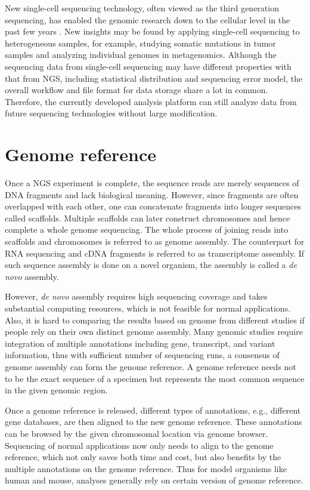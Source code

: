 New single-cell sequencing technology, often viewed as the third generation
sequencing, has enabled the genomic research down to the cellular level in the
past few years \cite{gawad2016:singlecell}. New insights may be found by
applying single-cell sequencing to heterogeneous samples, for example, studying
somatic mutations in tumor samples and analyzing individual genomes in
metagenomics. Although the sequencing data from single-cell sequencing may have
different properties with that from NGS, including statistical distribution and
sequencing error model, the overall workflow and file format for data storage
share a lot in common. Therefore, the currently developed analysis platform can
still analyze data from future sequencing technologies without large
modification.



\section{Genome reference}
\label{s:genome-ref}

Once a NGS experiment is complete, the sequence reads are merely sequences of
DNA fragments and lack biological meaning. However, since fragments are often
overlapped with each other, one can concatenate fragments into longer sequences
called scaffolds. Multiple scaffolds can later construct chromosomes and hence
complete a whole genome sequencing. The whole process of joining reads into
scaffolds and chromosomes is referred to as genome assembly. The counterpart
for RNA sequencing and cDNA fragments is referred to as transcriptome assembly.
If such sequence assembly is done on a novel organism, the assembly is called a
\textit{de novo} assembly.

However, \textit{de novo} assembly requires high sequencing coverage and takes
substantial computing resources, which is not feasible for normal applications.
Also, it is hard to comparing the results based on genome from different
studies if people rely on their own distinct genome assembly. Many genomic
studies require integration of multiple annotations including gene, transcript,
and variant information, thus with sufficient number of sequencing runs, a
consensus of genome assembly can form the genome reference. A genome reference
needs not to be the exact sequence of a specimen but represents the most common
sequence in the given genomic region.

Once a genome reference is released, different types of annotations, e.g.,
different gene databases, are then aligned to the new genome reference. These
annotations can be browsed by the given chromosomal location via genome
browser. Sequencing of normal applications now only needs to align to the
genome reference, which not only saves both time and cost, but also benefits by
the multiple annotations on the genome reference. Thus for model organisms like
human and mouse, analyses generally rely on certain version of genome
reference.

